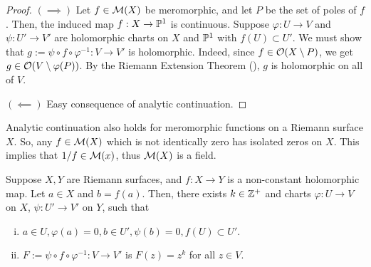 \documentclass[11pt]{article}
\begin{document}
\begin{proof}
\hfill \break
    $(\implies)$ Let $f \in \mathcal M(X)$ be meromorphic, and let $P$ be the set of poles of $f$. Then, the induced map $f:X \to \mathbb P^1$ is continuous. Suppose $\varphi:U \to V$ and $\psi:U'\to V'$ are holomorphic charts on $X$ and $\mathbb P^1$ with $f(U) \subset U'$. We must show that $g:= \psi \circ f \circ \varphi^{-1}:V \to V'$ is holomorphic. Indeed, since $f \in \mathcal O(X \setminus P)$, we get $g \in \mathcal O(V\setminus \varphi(P))$. By the Riemann Extension Theorem (), $g$ is holomorphic on all of $V$.

    $(\impliedby)$ Easy consequence of analytic continuation.
\end{proof}

\begin{cor}
    Analytic continuation also holds for meromorphic functions on a Riemann surface $X$. So, any $f \in \mathcal M(X)$ which is not identically zero has isolated zeros on $X$. This implies that $1/f\in \mathcal M(x)$, thus $\mathcal M(X)$ is a field.
\end{cor}

\begin{thm}
    Suppose $X,Y$ are Riemann surfaces, and $f:X \to Y$ is a non-constant holomorphic map. Let $a \in X$ and $b=f(a)$. Then, there exists $k \in \mathbb{Z}^+$ and charts $\varphi:U \to V$ on $X$, $\psi:U' \to V'$ on $Y$, such that
    \begin{enumerate}[(i)]
        \item $a \in U, \varphi(a) =0, b \in U', \psi(b)=0, f(U) \subset U'$.
        \item $F:= \psi \circ f \circ \varphi^{-1}:V \to V'$ is $F(z) =z^k$ for all $z \in V$.
    \end{enumerate}
\end{thm}
\end{document}
